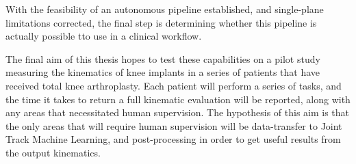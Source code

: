 With the feasibility of an autonomous pipeline established, and single-plane limitations corrected, the final step is determining whether this pipeline is actually possible tto use in a clinical workflow.

The final aim of this thesis hopes to test these capabilities on a pilot study measuring the kinematics of knee implants in a series of patients that have received total knee arthroplasty. Each patient will perform a series of tasks, and the time it takes to return a full kinematic evaluation will be reported, along with any areas that necessitated human supervision. The hypothesis of this aim is that the only areas that will require human supervision will be data-transfer to Joint Track Machine Learning, and post-processing in order to get useful results from the output kinematics. 